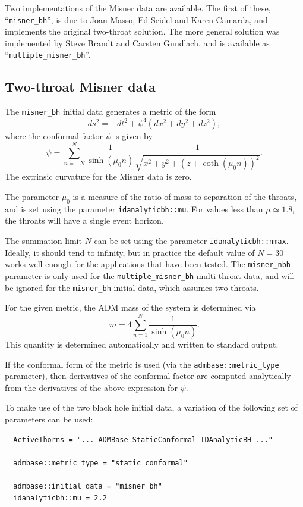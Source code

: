 \documentclass{article}
\begin{document}
Two implementations of the Misner data are available. The first of
these, ``\texttt{misner\_bh}'', is due to Joan Masso, Ed Seidel and
Karen Camarda, and implements the original two-throat solution. The
more general solution was implemented by Steve Brandt and Carsten
Gundlach, and is available as ``\texttt{multiple\_misner\_bh}''.

\subsection{Two-throat Misner data}

The \texttt{misner\_bh} initial data generates a metric of the form
\begin{equation}
  ds^2 = -dt^2 + \psi^4 (dx^2 + dy^2 + dz^2),
\end{equation}
where the conformal factor $\psi$ is given by
\begin{equation}
  \psi = \sum^N_{n=-N}
  \frac{1}{\sinh(\mu_0 n)}
  \frac{1}{\sqrt{x^2 + y^2 + (z + \coth(\mu_0 n))^2}}.
\end{equation}
The extrinsic curvature for the Misner data is zero.

The parameter $\mu_0$ is a measure of the ratio of mass to separation
of the throats, and is set using the parameter
\texttt{idanalyticbh::mu}. For values less than $\mu\simeq 1.8$, the
throats will have a single event horizon.

The summation limit $N$ can be set using the parameter
\texttt{idanalyticbh::nmax}. Ideally, it should tend to infinity, but
in practice the default value of $N=30$ works well enough for the
applications that have been tested. The \texttt{misner\_nbh} parameter
is only used for the \texttt{multiple\_misner\_bh} multi-throat data,
and will be ignored for the \texttt{misner\_bh} initial data, which
assumes two throats.

For the given metric, the ADM mass of the system is determined via
\begin{equation}
  m = 4 \sum^N_{n=1} \frac{1}{\sinh(\mu_0 n)}.
\end{equation}
This quantity is determined automatically and written to standard
output.

If the conformal form of the metric is used (via the
\texttt{admbase::metric\_type} parameter), then derivatives of the
conformal factor are computed analytically from the derivatives of the
above expression for $\psi$.

To make use of the two black hole initial data, a variation of the
following set of parameters can be used:
\begin{verbatim}
  ActiveThorns = "... ADMBase StaticConformal IDAnalyticBH ..."

  admbase::metric_type = "static conformal"

  admbase::initial_data = "misner_bh"
  idanalyticbh::mu = 2.2
\end{verbatim}
\end{document}
